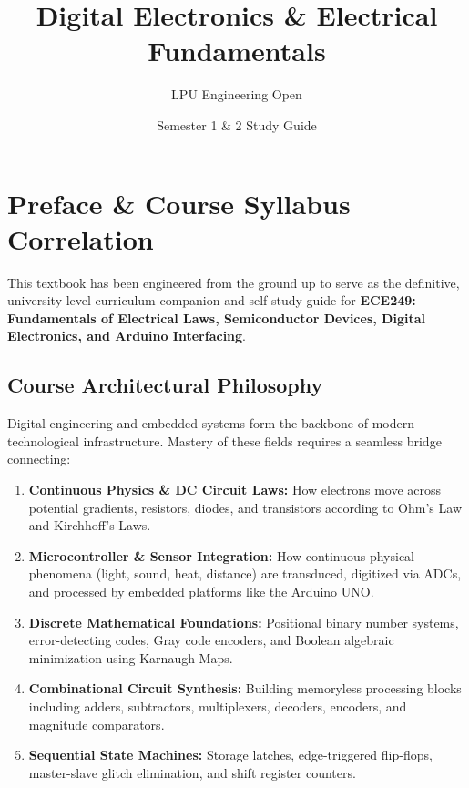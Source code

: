 \documentclass[a4paper,11pt,oneside,openany]{book}
\title{Digital Electronics \& Electrical Fundamentals}
\author{LPU Engineering Open}
\date{Semester 1 \& 2 Study Guide}
\begin{document}
\frontmatter

\makebookcover
\copyrightpage
\disclaimerpage
\chapter*{Preface \& Course Syllabus Correlation}

\noindent This textbook has been engineered from the ground up to serve as the definitive, university-level curriculum companion and self-study guide for \textbf{ECE249: Fundamentals of Electrical Laws, Semiconductor Devices, Digital Electronics, and Arduino Interfacing}. 

\section*{Course Architectural Philosophy}
Digital engineering and embedded systems form the backbone of modern technological infrastructure. Mastery of these fields requires a seamless bridge connecting:
\begin{enumerate}
    \item \textbf{Continuous Physics \& DC Circuit Laws:} How electrons move across potential gradients, resistors, diodes, and transistors according to Ohm's Law and Kirchhoff's Laws.
    \item \textbf{Microcontroller \& Sensor Integration:} How continuous physical phenomena (light, sound, heat, distance) are transduced, digitized via ADCs, and processed by embedded platforms like the Arduino UNO.
    \item \textbf{Discrete Mathematical Foundations:} Positional binary number systems, error-detecting codes, Gray code encoders, and Boolean algebraic minimization using Karnaugh Maps.
    \item \textbf{Combinational Circuit Synthesis:} Building memoryless processing blocks including adders, subtractors, multiplexers, decoders, encoders, and magnitude comparators.
    \item \textbf{Sequential State Machines:} Storage latches, edge-triggered flip-flops, master-slave glitch elimination, and shift register counters.
\end{enumerate}
\end{document}
